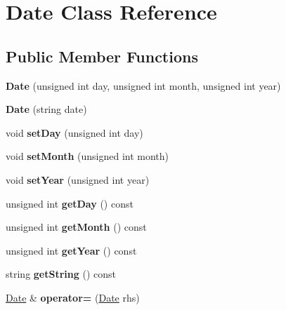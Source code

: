 \hypertarget{class_date}{}\section{Date Class Reference}
\label{class_date}
\subsection*{Public Member Functions}
\begin{DoxyCompactItemize}
\item 
\hypertarget{class_date_a28c6604a0f8ed8216becf24abc20cf5b}{}{\bfseries Date} (unsigned int day, unsigned int month, unsigned int year)\label{class_date_a28c6604a0f8ed8216becf24abc20cf5b}

\item 
\hypertarget{class_date_a5532efafed41fd5f8e013a61313200dc}{}{\bfseries Date} (string date)\label{class_date_a5532efafed41fd5f8e013a61313200dc}

\item 
\hypertarget{class_date_a18dc2bd52ab8adcca331f66c27ed6623}{}void {\bfseries set\+Day} (unsigned int day)\label{class_date_a18dc2bd52ab8adcca331f66c27ed6623}

\item 
\hypertarget{class_date_aa83b79359070012ab58ff99abeb34340}{}void {\bfseries set\+Month} (unsigned int month)\label{class_date_aa83b79359070012ab58ff99abeb34340}

\item 
\hypertarget{class_date_a1299c7e1f0080304f082a9225a743957}{}void {\bfseries set\+Year} (unsigned int year)\label{class_date_a1299c7e1f0080304f082a9225a743957}

\item 
\hypertarget{class_date_a254204c492d3ebc26a2c62d532e34844}{}unsigned int {\bfseries get\+Day} () const \label{class_date_a254204c492d3ebc26a2c62d532e34844}

\item 
\hypertarget{class_date_ac471b901531b7a1e73809918bac8c1ec}{}unsigned int {\bfseries get\+Month} () const \label{class_date_ac471b901531b7a1e73809918bac8c1ec}

\item 
\hypertarget{class_date_a6561cf495bd6b7e6c747420d7ae9cc12}{}unsigned int {\bfseries get\+Year} () const \label{class_date_a6561cf495bd6b7e6c747420d7ae9cc12}

\item 
\hypertarget{class_date_aae63c76af05fad3181883ba040bcd074}{}string {\bfseries get\+String} () const \label{class_date_aae63c76af05fad3181883ba040bcd074}

\item 
\hypertarget{class_date_a6835b4cfb6a3034a8daa0168c4e9d614}{}\hyperlink{class_date}{Date} \& {\bfseries operator=} (\hyperlink{class_date}{Date} rhs)\label{class_date_a6835b4cfb6a3034a8daa0168c4e9d614}

\end{DoxyCompactItemize}
